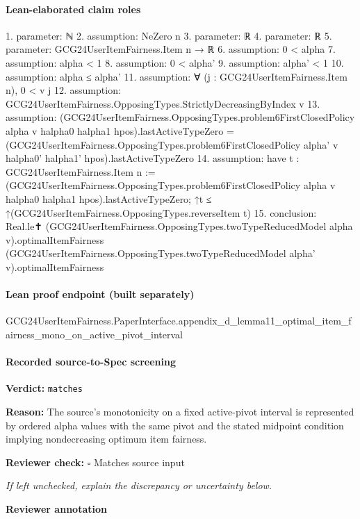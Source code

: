 \documentclass[10pt]{article}
\newcommand{\reviewerbox}{%
  \par\noindent\fbox{\parbox{0.96\linewidth}{\rule{0pt}{0.38in}}}\par
}
\newcommand{\reviewmatch}[1]{%
  \par\noindent\textbf{Reviewer check:} $\square$\; #1\par
  \noindent\emph{If left unchecked, explain the discrepancy or uncertainty below.}\par
}
\begin{document}
\paragraph{Lean-elaborated claim roles}\begin{ReviewVerbatim}
1. parameter: ℕ
2. assumption: NeZero n
3. parameter: ℝ
4. parameter: ℝ
5. parameter: GCG24UserItemFairness.Item n → ℝ
6. assumption: 0 < alpha
7. assumption: alpha < 1
8. assumption: 0 < alpha'
9. assumption: alpha' < 1
10. assumption: alpha ≤ alpha'
11. assumption: ∀ (j : GCG24UserItemFairness.Item n), 0 < v j
12. assumption: GCG24UserItemFairness.OpposingTypes.StrictlyDecreasingByIndex v
13. assumption: (GCG24UserItemFairness.OpposingTypes.problem6FirstClosedPolicy alpha v halpha0 halpha1 hpos).lastActiveTypeZero =
  (GCG24UserItemFairness.OpposingTypes.problem6FirstClosedPolicy alpha' v halpha0' halpha1' hpos).lastActiveTypeZero
14. assumption: have t : GCG24UserItemFairness.Item n :=
  (GCG24UserItemFairness.OpposingTypes.problem6FirstClosedPolicy alpha v halpha0 halpha1 hpos).lastActiveTypeZero;
↑t ≤ ↑(GCG24UserItemFairness.OpposingTypes.reverseItem t)
15. conclusion: Real.le✝ (GCG24UserItemFairness.OpposingTypes.twoTypeReducedModel alpha v).optimalItemFairness
  (GCG24UserItemFairness.OpposingTypes.twoTypeReducedModel alpha' v).optimalItemFairness
\end{ReviewVerbatim}

\paragraph{Lean proof endpoint (built separately)}\begin{ReviewVerbatim}
GCG24UserItemFairness.PaperInterface.appendix_d_lemma11_optimal_item_fairness_mono_on_active_pivot_interval
\end{ReviewVerbatim}

\paragraph{Recorded source-to-Spec screening}
\textbf{Verdict:} \texttt{matches}
\\
{\raggedright
\textbf{Reason:} The source's monotonicity on a fixed active-\allowbreak{}pivot interval is represented by ordered alpha values with the same pivot and the stated midpoint condition implying nondecreasing optimum item fairness.\allowbreak{}
\par}
\reviewmatch{Matches source input}
\noindent\textbf{Reviewer annotation}\par
\reviewerbox
\clearpage
\hypertarget{source-claim-2174fb755f649010}{}
\end{document}
